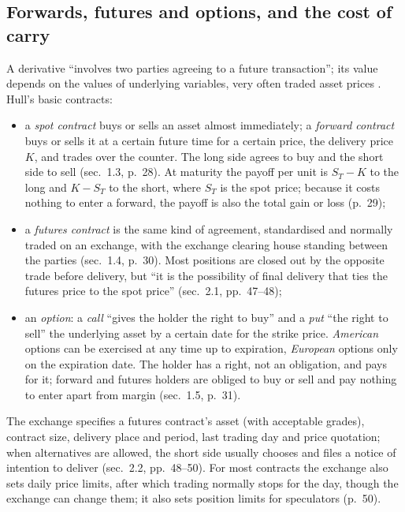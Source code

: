 \subsection{Forwards, futures and options, and the cost of carry}

\begin{qfdefinition}\label{def:derivative-contracts}
 A derivative ``involves two parties agreeing to a future transaction''; its value depends on the values of underlying variables, very often traded asset prices \citep[chap.~1, ``Introduction'', p.~23]{s7-hulloptions}. Hull's basic contracts:
\begin{itemize}
\item a \emph{spot contract} buys or sells an asset almost immediately; a \emph{forward contract} buys or sells it at a certain future time for a certain price, the delivery price $K$, and trades over the counter. The long side agrees to buy and the short side to sell (sec.~1.3, p.~28). At maturity the payoff per unit is $S_T-K$ to the long and $K-S_T$ to the short, where $S_T$ is the spot price; because it costs nothing to enter a forward, the payoff is also the total gain or loss (p.~29);
\item a \emph{futures contract} is the same kind of agreement, standardised and normally traded on an exchange, with the exchange clearing house standing between the parties (sec.~1.4, p.~30). Most positions are closed out by the opposite trade before delivery, but ``it is the possibility of final delivery that ties the futures price to the spot price'' (sec.~2.1, pp.~47--48);
\item an \emph{option}: a \emph{call} ``gives the holder the right to buy'' and a \emph{put} ``the right to sell'' the underlying asset by a certain date for the strike price. \emph{American} options can be exercised at any time up to expiration, \emph{European} options only on the expiration date. The holder has a right, not an obligation, and pays for it; forward and futures holders are obliged to buy or sell and pay nothing to enter apart from margin (sec.~1.5, p.~31).
\end{itemize}
The exchange specifies a futures contract's asset (with acceptable grades), contract size, delivery place and period, last trading day and price quotation; when alternatives are allowed, the short side usually chooses and files a notice of intention to deliver (sec.~2.2, pp.~48--50). For most contracts the exchange also sets daily price limits, after which trading normally stops for the day, though the exchange can change them; it also sets position limits for speculators (p.~50).


\end{qfdefinition}
